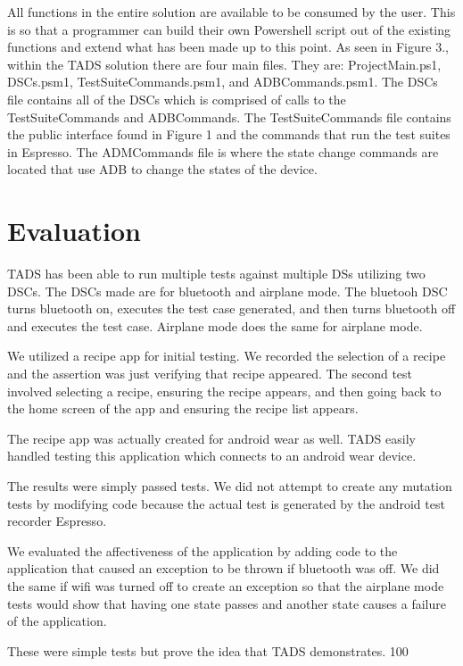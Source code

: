 All functions in the entire solution are available to be consumed by the user.  This is so that a programmer can build their own Powershell script out of the existing functions and extend what has been made up to this point.  
As seen in Figure 3., within the TADS solution there are four main files.  They are: ProjectMain.ps1, DSCs.psm1, TestSuiteCommands.psm1, and ADBCommands.psm1.  The DSCs file contains all of the DSCs which is comprised of calls to the TestSuiteCommands and ADBCommands.  The TestSuiteCommands file contains the public interface found in Figure 1 and the commands that run the test suites in Espresso.  The ADMCommands file is where the state change commands are located that use ADB to change the states of the device. 



\section{Evaluation}
TADS has been able to run multiple tests against multiple DSs utilizing two DSCs.  The DSCs made are for bluetooth and airplane mode.  The bluetooh DSC turns bluetooth on, executes the test case generated, and then turns bluetooth off and executes the test case.  Airplane mode does the same for airplane mode.    

We utilized a recipe app for initial testing.  We recorded the selection of a recipe and the assertion was just verifying that recipe appeared.  The second test involved selecting a recipe, ensuring the recipe appears, and then going back to the home screen of the app and ensuring the recipe list appears.  

The recipe app was actually created for android wear as well.  TADS easily handled testing this application which connects to an android wear device.  

The results were simply passed tests.  We did not attempt to create any mutation tests by modifying code because the actual test is generated by the android test recorder Espresso.  

We evaluated the affectiveness of the application by adding code to the application that caused an exception to be thrown if bluetooth was off.  We did the same if wifi was turned off to create an exception so that the airplane mode tests would show that having one state passes and another state causes a failure of the application.  

These were simple tests but prove the idea that TADS demonstrates.  100%

